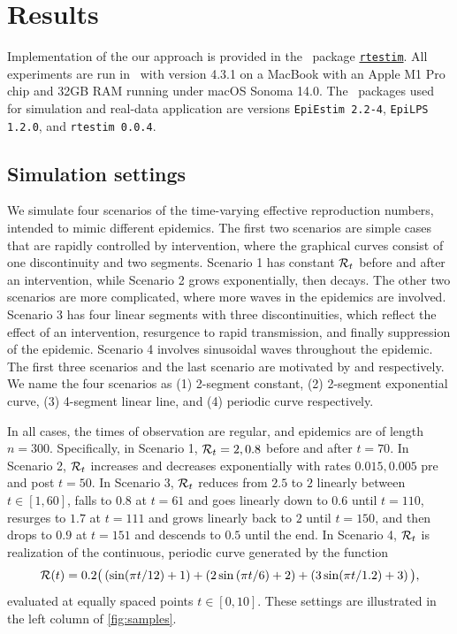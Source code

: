 \section{Results}

Implementation of the our approach is provided in the \R\ package
\href{https://dajmcdon.github.io/rtestim/}{\texttt{rtestim}}. All experiments
are run in \R\ with version 4.3.1 on a MacBook with an Apple M1 Pro chip
and 32GB RAM running under macOS Sonoma 14.0. The \R\ packages used for
simulation and real-data application are versions \texttt{EpiEstim 2.2-4},
\texttt{EpiLPS 1.2.0}, and \texttt{rtestim 0.0.4}. 

\subsection{Simulation settings}

We simulate four scenarios of the time-varying effective reproduction numbers,
intended to mimic different epidemics. The first two scenarios are simple cases
that are rapidly controlled by intervention, where the graphical curves consist
of one discontinuity and two segments. Scenario 1 has constant $\mathcal{R}_t$ before
and after an intervention, while Scenario 2 grows exponentially, then decays.
The other two scenarios are more complicated, where more waves in the epidemics
are involved. Scenario 3 has four linear segments with three discontinuities,
which reflect the effect of an intervention, resurgence to rapid transmission,
and finally suppression of the epidemic. Scenario 4 involves sinusoidal waves
throughout the epidemic.
The first three scenarios and the last scenario are motivated by
\citet{parag2021improved} and \citet{gressani2022epilps} respectively. 
We name the four scenarios as (1) 2-segment constant, (2) 2-segment exponential 
curve, (3) 4-segment linear line, and (4) periodic curve respectively. 

In all cases, the times of observation are regular, and epidemics are of
length $n=300$. Specifically, in Scenario 1, $\mathcal{R}_t = 2, 0.8$ before and after
$t=70$. In Scenario 2, $\mathcal{R}_t$ increases and decreases exponentially with
rates $0.015, 0.005$ pre and post $t=50$. In Scenario 3, $\mathcal{R}_t$ reduces from
$2.5$ to $2$ linearly between $t\in[1,60]$, falls to $0.8$ at $t=61$ and goes
linearly down to $0.6$ until $t=110$, resurges to $1.7$ at $t=111$ and grows
linearly back to $2$ until $t=150$, and then drops to $0.9$ at $t=151$ and
descends to $0.5$ until the end. In Scenario 4, $\mathcal{R}_t$ is realization of the
continuous, periodic curve generated by the function $$\mathcal{R}(t) = 0.2 \big(
\left(\sin(\pi t/12) + 1\right) + \left(2 \sin\left(\pi t / 6\right) + 2\right) + \left(3
\sin(\pi t / 1.2) + 3\right)\big),$$ evaluated at equally spaced points $t\in [0,10]$. These
settings are illustrated in the left column of \autoref{fig:samples}.


